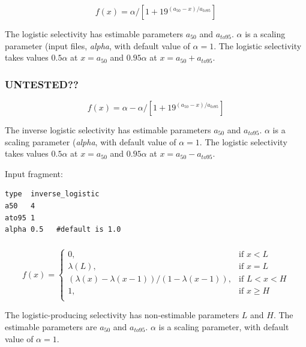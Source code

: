 \begin{equation}
  f(x) = \alpha / [1+19^{(a_{50}-x)/a_{to95}}]
\end{equation}

The logistic selectivity has estimable parameters $a_{50}$ and $a_{to95}$. $\alpha$ is a scaling parameter (input files, \textit{alpha}, with default value of $\alpha = 1$. The logistic selectivity takes values $0.5 \alpha$ at $x=a_{50}$ and $0.95 \alpha$ at $x=a_{50}+a_{to95}$.

\subsubsection[Inverse logistic]{ UNTESTED??}

\begin{equation}
  f(x) = \alpha - \alpha / [1+19^{(a_{50}-x)/a_{to95}}]
\end{equation}

The inverse logistic selectivity has estimable parameters $a_{50}$ and $a_{to95}$. $\alpha$ is a scaling parameter (\textit{alpha}, with default value of $\alpha = 1$. The logistic selectivity takes values $0.5 \alpha$ at $x=a_{50}$ and $0.95 \alpha$ at $x=a_{50}-a_{to95}$.

Input fragment: {\small{\begin{verbatim}
type  inverse_logistic
a50   4
ato95 1
alpha 0.5   #default is 1.0
\end{verbatim}}}

\subsubsection[Logistic producing]{}

\begin{equation}
f(x)=\begin{cases}
	  0, & \text{if $x < L$} \\
	  \lambda(L), & \text{if $x=L$} \\
	  \left( \lambda(x)-\lambda(x-1) \right) / \left( 1-\lambda(x-1) \right), & \text{if $L < x < H$} \\
	  1, & \text{if $x \ge H$} \\
  \end{cases}
\end{equation}

The logistic-producing selectivity has non-estimable parameters $L$ and $H$. The estimable parameters are $a_{50}$ and $a_{to95}$. $\alpha$ is a scaling parameter, with default value of $\alpha = 1$.

